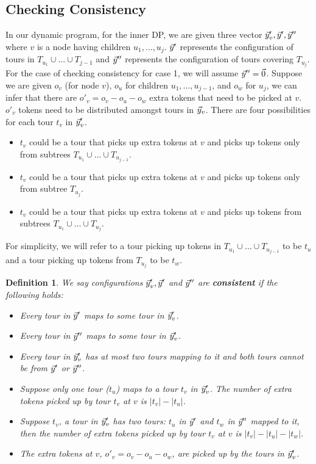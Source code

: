 \documentclass[twoside,leqno]{article}
\newtheorem{definition}{Definition}
\begin{document}
\subsection{Checking Consistency}
In our dynamic program, for the inner DP, we are given three vector $\vec{y}_v', \vec{y}', \vec{y}''$ where $v$ is a node having children $u_1, \ldots, u_{j}$. $\vec{y}'$ represents the configuration of tours in $T_{u_1} \cup \ldots \cup T_{j-1}$ and $\vec{y}''$ represents the configuration of tours covering $T_{u_{j}}$. For the case of checking consistency for case 1, we will assume $\vec{y}'' = \vec{0}$. Suppose we are given $o_v$ (for node $v$), $o_u$ for children $u_1,\ldots,u_{j-1}$, and
$o_w$ for $u_j$, we can infer that there are $o'_v = o_v - o_u - o_w$ extra tokens that need to be picked at $v$. $o'_v$ tokens need to be distributed amongst tours in $\vec{y}_v$. 
There are four possibilities for each tour $t_v$ in $\vec{y}_v'$. 
\begin{itemize}
    \item $t_v$ could be a tour that picks up extra tokens at $v$ and picks up tokens only from subtrees $T_{u_1} \cup \ldots \cup T_{u_{j-1}}$. 
    \item $t_v$ could be a tour that picks up extra tokens at $v$ and picks up tokens only from subtree $T_{u_{j}}$.
    \item $t_v$ could be a tour that picks up extra tokens at $v$ and picks up tokens from subtrees $T_{u_1} \cup \ldots \cup T_{u_{j}}$. 
\end{itemize}
For simplicity, we will refer to a tour picking up tokens in $T_{u_1} \cup \ldots \cup T_{u_{j-1}}$ to be $t_u$ and a tour picking up tokens from $T_{u_{j}}$ to be $t_w$.  
\begin{definition}
We say configurations $\vec{y}_v', \vec{y}'$ and $\vec{y}''$ are \textbf{consistent} if the following holds: 
\begin{itemize}
    \item Every tour in $\vec{y}'$ maps to some tour in $\vec{y}_v'$. 
    \item Every tour in $\vec{y}''$ maps to some tour in $\vec{y}_v'$. 
    \item Every tour in $\vec{y}_v'$ has at most two tours mapping to it and both tours cannot be from $\vec{y}'$ or $\vec{y}''$. 
    \item Suppose only one tour ($t_u$) maps to a tour $t_v$ in $\vec{y}_v'$. The number of extra tokens picked up by tour $t_v$ at $v$ is $|t_v| - |t_u|$. 
    \item Suppose $t_v$, a tour in $\vec{y}_v'$ has two tours: $t_u$ in $\vec{y}'$ and $t_w$ in $\vec{y}''$ mapped to it, then the number of extra tokens picked up by tour $t_v$ at $v$ is $|t_v| - |t_u| - |t_w|$. 
    \item The extra tokens at $v$, $o'_v = o_v - o_u - o_w$, are picked up by the tours in $\vec{y}_v'$. 
\end{itemize}
\end{definition}
\end{document}
